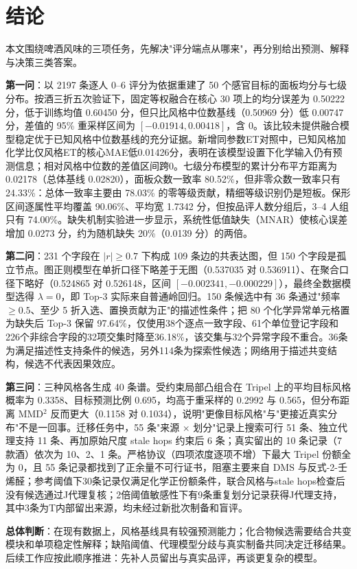 \section{结论}\label{sec:concl}

本文围绕啤酒风味的三项任务，先解决"评分端点从哪来"，再分别给出预测、解释与决策三类答案。

\textbf{第一问}：以 2197 条逐人 0--6 评分为依据重建了 50 个感官目标的面板均分与七级分布。按酒三折五次验证下，固定等权融合在核心 30 项上的均分误差为 0.50222 分，低于训练均值 0.60450 分，但只比风格中位数基线（0.50969 分）低 0.00747 分，差值的 95\% 重采样区间为 $[-0.01914,0.00418]$，含 0。该比较未提供融合模型稳定优于已知风格中位数基线的充分证据。新增同参数ET对照中，已知风格加化学比仅风格ET的核心MAE低0.01426分，表明在该模型设置下化学输入仍有预测信息；相对风格中位数的差值区间跨0。七级分布模型的累计分布平方距离为 0.02178（总体基线 0.02820），面板众数一致率 80.52\%，但非零众数一致率只有 24.33\%：总体一致率主要由 78.03\% 的零等级贡献，精细等级识别仍是短板。保形区间逐属性平均覆盖 90.06\%、平均宽 1.7342 分，但按品评人数分组后，3--4 人组只有 74.00\%。缺失机制实验进一步显示，系统性低值缺失（MNAR）使核心误差增加 0.0273 分，约为随机缺失 20\%（0.0139 分）的两倍。

\textbf{第二问}：231 个字段在 $|r|\ge0.7$ 下构成 109 条边的共表达图，但 150 个字段是孤立节点。图正则模型在单折口径下略差于无图（0.537035 对 0.536911）、在聚合口径下略好（0.524865 对 0.526148，区间 $[-0.002341,-0.000229]$），最终全数据模型选得 $\lambda=0$，即 Top-3 实际来自普通岭回归。150 条候选中有 36 条通过"频率 $\ge0.5$、至少 5 折入选、置换贡献为正"的描述性条件；把 80 个化学异常单元格置为缺失后 Top-3 保留 97.64\%，仅使用38个逐点一致字段、61个单位登记字段和226个非综合字段的32项交集时降至36.18\%，该交集与32个异常字段不重合。36条为满足描述性支持条件的候选，另外114条为探索性候选；网络用于描述共变结构，候选不代表因果效应。

\textbf{第三问}：三种风格各生成 40 条谱。受约束局部凸组合在 Tripel 上的平均目标风格概率为 0.3358、目标预测比例 0.695，均高于重采样的 0.2992 与 0.565，但分布距离 MMD$^2$ 反而更大（0.1158 对 0.1034），说明"更像目标风格"与"更接近真实分布"不是一回事。迁移任务中，55 条"来源 $\times$ 划分"记录上搜索可行 51 条、独立代理支持 11 条、再加原始尺度 stale hops 约束后 6 条；真实留出的 10 条记录（7 款酒）依次为 10、2、1 条。严格协议（四项浓度逐项不增）下最大 Tripel 份额全为 0，且 55 条记录都找到了正余量不可行证书，阻塞主要来自 DMS 与反式-2-壬烯醛；参考阈值下30条记录仅满足化学正份额条件，联合风格与stale hops检查后没有候选通过J代理复核；2倍阈值敏感性下有9条重复划分记录获得J代理支持，其中3条为T内部留出来源，均未经过新批次制备和盲评。

\textbf{总体判断}：在现有数据上，风格基线具有较强预测能力；化合物候选需要结合共变模块和单项稳定性解释；缺陷阈值、代理模型分歧与真实制备共同决定迁移结果。后续工作应按此顺序推进：先补人员留出与真实品评，再谈更复杂的模型。
